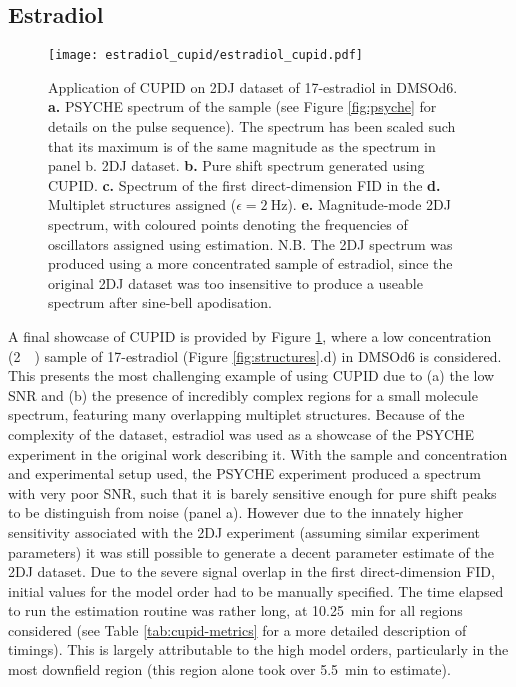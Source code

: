 \subsection{Estradiol}
\begin{figure}
    \texttt{[image: estradiol\_cupid/estradiol\_cupid.pdf]}%
    \caption[
        Application of \acs{CUPID} on a 17\textbeta-estradiol dataset.
    ]{
        Application of \acs{CUPID} on \ac{2DJ} dataset of 17\textbeta-estradiol
        in \acs{DMSOd6}.
        \textbf{a.} \acs{PSYCHE} spectrum of the sample (see Figure
        \ref{fig:psyche} for details on the pulse sequence). The spectrum has
        been scaled such that its maximum is of the same magnitude as the
        spectrum in panel b.
        \ac{2DJ} dataset.
        \textbf{b.} Pure shift spectrum generated using \ac{CUPID}.
        \textbf{c.} Spectrum of the first direct-dimension \ac{FID} in the
        \textbf{d.} Multiplet structures assigned ($\epsilon =
        \qty{2}{\hertz}$).
        \textbf{e.} Magnitude-mode \ac{2DJ} spectrum, with coloured points
        denoting the frequencies of oscillators assigned using estimation.
        N.B. The \ac{2DJ} spectrum was produced using a more concentrated
        sample of estradiol, since the original \ac{2DJ} dataset was too
        insensitive to produce a useable spectrum after sine-bell apodisation.
    }
    \label{fig:estradiol-cupid}%
\end{figure}

A final showcase of \ac{CUPID} is provided by Figure \ref{fig:estradiol-cupid},
where a low concentration (\qty{2}{\milli\molar}) sample of
17\textbeta-estradiol (Figure \ref{fig:structures}.d) in \acs{DMSOd6} is
considered. This presents the most challenging example of using \ac{CUPID} due
to (a) the low \ac{SNR} and (b) the presence of incredibly complex regions for
a small molecule spectrum, featuring many overlapping multiplet structures.
Because of the complexity of the dataset, estradiol was used as a showcase of
the \ac{PSYCHE} experiment in the original work describing
it\cite{Foroozandeh2014}. With the sample and concentration and experimental
setup used, the \ac{PSYCHE} experiment produced a spectrum with very poor
\ac{SNR}, such that it is barely sensitive enough for pure shift peaks to be
distinguish from noise (panel a). However due to the innately higher
sensitivity associated with the \ac{2DJ} experiment (assuming similar
experiment parameters) it was still possible to generate a decent parameter
estimate of the \ac{2DJ} dataset. Due to the severe signal overlap in the first
direct-dimension \ac{FID}, initial values for the model order had to be
manually specified.  The time elapsed to run the estimation routine was rather
long, at \qty{10.25}{\minute} for all regions considered (see Table
\ref{tab:cupid-metrics} for a more detailed description of timings). This is
largely attributable to the high model orders, particularly in the most
downfield region (this region alone took over \qty{5.5}{\minute} to estimate).
